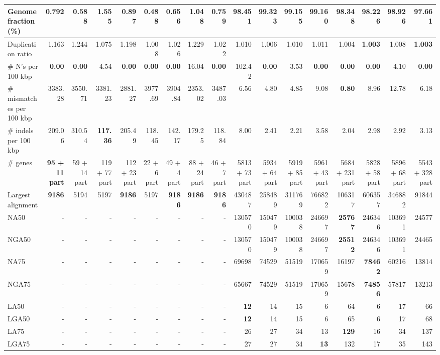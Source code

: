 \documentclass[12pt,a4paper]{article}
\begin{document}
\begin{table}[ht]
\begin{center}
\begin{tabular}{|l*{16}{|r}|}
Genome fraction (\%) & 0.792 & 0.588 & 1.555 & 0.897 & 0.488 & 0.656 & 1.048 & 0.759 & 98.451 & {\bf 99.323} & 99.155 & 99.160 & 98.348 & 98.226 & 98.926 & 97.661 \\ \hline
Duplication ratio & 1.163 & 1.244 & 1.075 & 1.198 & 1.008 & 1.026 & 1.229 & 1.022 & 1.010 & 1.006 & 1.010 & 1.011 & 1.004 & {\bf 1.003} & 1.008 & {\bf 1.003} \\ \hline
\# N's per 100 kbp & {\bf 0.00} & {\bf 0.00} & 4.54 & {\bf 0.00} & {\bf 0.00} & {\bf 0.00} & 16.04 & {\bf 0.00} & 102.42 & {\bf 0.00} & 3.53 & {\bf 0.00} & {\bf 0.00} & {\bf 0.00} & 4.10 & {\bf 0.00} \\ \hline
\# mismatches per 100 kbp & 3383.28 & 3550.71 & 3381.23 & 2881.27 & 3977.69 & 3904.84 & 2353.02 & 3487.03 & 6.56 & 4.80 & 4.85 & 9.08 & {\bf 0.80} & 8.96 & 12.78 & 6.18 \\ \hline
\# indels per 100 kbp & 209.06 & 310.54 & {\bf 117.36} & 205.49 & 118.45 & 142.17 & 179.25 & 118.84 & 8.00 & 2.41 & 2.21 & 3.58 & 2.04 & 2.98 & 2.92 & 3.13 \\ \hline
\# genes & {\bf 95 + 11 part} & 59 + 14 part & 119 + 77 part & 112 + 23 part & 22 + 6 part & 49 + 4 part & 88 + 24 part & 46 + 7 part & 5813 + 73 part & 5934 + 64 part & 5919 + 85 part & 5961 + 43 part & 5684 + 231 part & 5828 + 58 part & 5896 + 68 part & 5543 + 328 part \\ \hline
Largest alignment & {\bf 9186} & 5194 & 5197 & {\bf 9186} & 5197 & {\bf 9186} & {\bf 9186} & {\bf 9186} & 430487 & 258489 & 311769 & 766822 & 106317 & 606357 & 346882 & 91844 \\ \hline
NA50 & - & - & - & - & - & - & - & - & 130570 & 150479 & 100038 & 246697 & {\bf 25767} & 246346 & 103691 & 24577 \\ \hline
NGA50 & - & - & - & - & - & - & - & - & 130570 & 150479 & 100038 & 246697 & {\bf 25512} & 246346 & 103691 & 24465 \\ \hline
NA75 & - & - & - & - & - & - & - & - & 69698 & 74529 & 51519 & 170659 & 16197 & {\bf 78462} & 60216 & 13814 \\ \hline
NGA75 & - & - & - & - & - & - & - & - & 65667 & 74529 & 51519 & 170659 & 15678 & {\bf 74856} & 57817 & 13213 \\ \hline
LA50 & - & - & - & - & - & - & - & - & {\bf 12} & 14 & 15 & 6 & 64 & 6 & 17 & 66 \\ \hline
LGA50 & - & - & - & - & - & - & - & - & {\bf 12} & 14 & 15 & 6 & 65 & 6 & 17 & 68 \\ \hline
LA75 & - & - & - & - & - & - & - & - & 26 & 27 & 34 & 13 & {\bf 129} & 16 & 34 & 137 \\ \hline
LGA75 & - & - & - & - & - & - & - & - & 27 & 27 & 34 & {\bf 13} & 132 & 17 & 35 & 143 \\ \hline
\end{tabular}
\end{center}
\end{table}
\end{document}
